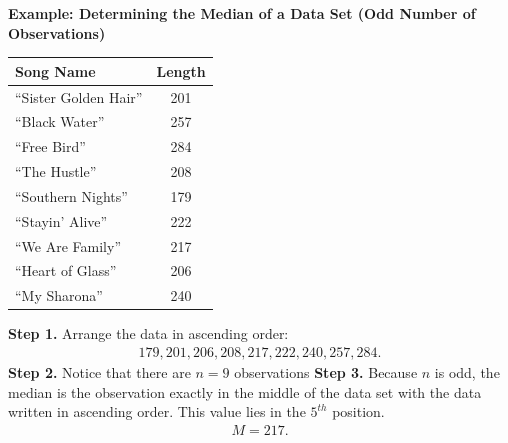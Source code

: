 \documentclass{report}
\begin{document}
        \begin{mdframed}
          \textbf{Example: Determining the Median of a Data Set (Odd Number of Observations)}
          \begin{center}
              \begin{tabular}{|l|c|}
                \hline
                \textbf{Song Name} & \textbf{Length} \\
                \hline
                ``Sister Golden Hair'' & 201 \\
                \hline
                ``Black Water'' & 257 \\
                \hline
                ``Free Bird'' & 284 \\
                \hline
                ``The Hustle'' & 208 \\
                \hline
                ``Southern Nights'' & 179 \\
                \hline
                ``Stayin' Alive'' & 222 \\
                \hline
                ``We Are Family'' & 217 \\
                \hline
                ``Heart of Glass'' & 206 \\
                \hline
                ``My Sharona'' & 240 \\
                \hline
                \end{tabular}
          \end{center}
          \bigbreak \noindent 
          \textbf{Step 1.} Arrange the data in ascending order:
          \begin{align*}
              179,201,206,208,217,222,240,257,284
          .\end{align*}
          \bigbreak \noindent 
          \textbf{Step 2.} Notice that there are $n=9$ observations 
          \bigbreak \noindent 
          \textbf{Step 3.} Because $n$ is odd, the median is the observation exactly in the middle of the data set with the data written in ascending order. This value lies in the $5^{th} $ position.
          \begin{align*}
              M= 217
          .\end{align*}
        \end{mdframed}
        \pagebreak \bigbreak \noindent
        \bigbreak \noindent 
\end{document}
